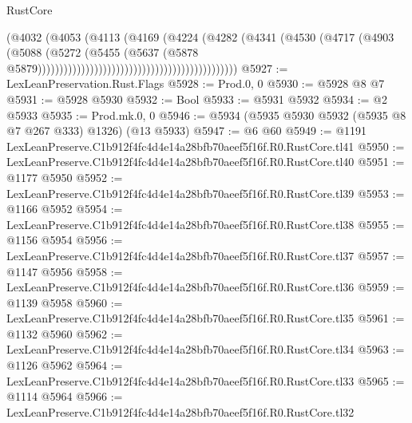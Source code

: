 \begin{lexlean}{RustCore}
\begin{coremodule}
                                                                  (@4032
                                                                    (@4053
                                                                      (@4113
                                                                        (@4169
                                                                          (@4224
                                                                            (@4282
                                                                              (@4341
                                                                                (@4530
                                                                                  (@4717
                                                                                    (@4903
                                                                                      (@5088
                                                                                        (@5272
                                                                                          (@5455
                                                                                            (@5637
                                                                                              (@5878
                                                                                                @5879))))))))))))))))))))))))))))))))))))))))))))))
@5927 := LexLeanPreservation.Rust.Flags
@5928 := Prod.{0, 0}
@5930 := @5928 @8 @7
@5931 := @5928 @5930
@5932 := Bool
@5933 := @5931 @5932
@5934 := @2 @5933
@5935 := Prod.mk.{0, 0}
@5946 := @5934 (@5935 @5930 @5932 (@5935 @8 @7 @267 @333) @1326) (@13 @5933)
@5947 := @6 @60
@5949 := @1191 LexLeanPreserve.C1b912f4fc4d4e14a28bfb70aeef5f16f.R0.RustCore.tl41
@5950 := LexLeanPreserve.C1b912f4fc4d4e14a28bfb70aeef5f16f.R0.RustCore.tl40
@5951 := @1177 @5950
@5952 := LexLeanPreserve.C1b912f4fc4d4e14a28bfb70aeef5f16f.R0.RustCore.tl39
@5953 := @1166 @5952
@5954 := LexLeanPreserve.C1b912f4fc4d4e14a28bfb70aeef5f16f.R0.RustCore.tl38
@5955 := @1156 @5954
@5956 := LexLeanPreserve.C1b912f4fc4d4e14a28bfb70aeef5f16f.R0.RustCore.tl37
@5957 := @1147 @5956
@5958 := LexLeanPreserve.C1b912f4fc4d4e14a28bfb70aeef5f16f.R0.RustCore.tl36
@5959 := @1139 @5958
@5960 := LexLeanPreserve.C1b912f4fc4d4e14a28bfb70aeef5f16f.R0.RustCore.tl35
@5961 := @1132 @5960
@5962 := LexLeanPreserve.C1b912f4fc4d4e14a28bfb70aeef5f16f.R0.RustCore.tl34
@5963 := @1126 @5962
@5964 := LexLeanPreserve.C1b912f4fc4d4e14a28bfb70aeef5f16f.R0.RustCore.tl33
@5965 := @1114 @5964
@5966 := LexLeanPreserve.C1b912f4fc4d4e14a28bfb70aeef5f16f.R0.RustCore.tl32

\end{coremodule}
\end{lexlean}
